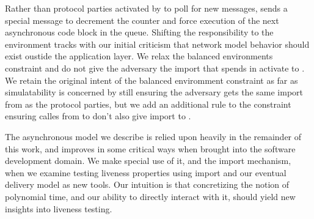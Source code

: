 Rather than protocol parties activated by \Z to poll for new messages, \Z sends
a special  message to decrement the counter and force
execution of the next asynchronous code block in the queue.  Shifting the
responsibility to the environment tracks with our initial criticism that
network model behavior should exist oustide the application layer.  We relax
the balanced environments constraint and do not give the adversary the import
that \Z spends in activate \fwrapper to .  We retain the
original intent of the balanced enviromment constraint as far as simulatability
is concerned by still ensuring the adversary gets the same import from \Z as
the protocol parties, but we add an additional rule to the constraint ensuring
 calles from \Z to \F don't also give import to \A.

The asynchronous model we describe is relied upon heavily in the remainder of
this work, and improves in some critical ways when brought into the software
development domain.  We make special use of it, and the import mechanism, when
we examine testing liveness properties using import and our eventual delivery
model as new tools.  Our intuition is that concretizing the notion of
polynomial time, and our ability to directly interact with it, should yield new
insights into liveness testing.


